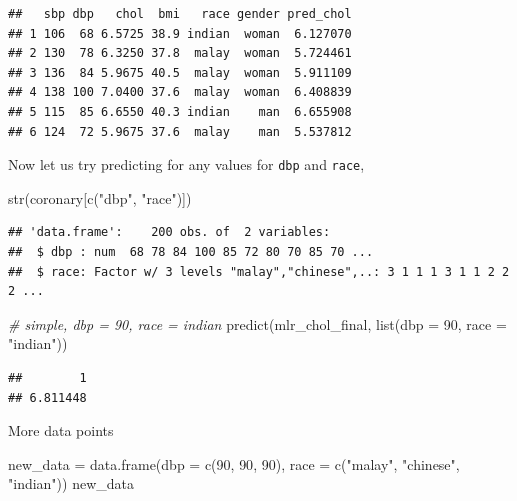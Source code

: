 \documentclass[
]{book}
\makeatletter
\newenvironment{Shaded}{\begin{snugshade}}{\end{snugshade}}
\newcommand{\AttributeTok}[1]{\textcolor[rgb]{0.61,0.61,0.61}{#1}}
\newcommand{\CommentTok}[1]{\textcolor[rgb]{0.37,0.37,0.37}{\textit{#1}}}
\newcommand{\DecValTok}[1]{\textcolor[rgb]{0.06,0.06,0.06}{#1}}
\newcommand{\FunctionTok}[1]{\textcolor[rgb]{0,0,0}{#1}}
\newcommand{\NormalTok}[1]{#1}
\newcommand{\OtherTok}[1]{\textcolor[rgb]{0.37,0.37,0.37}{#1}}
\newcommand{\SpecialCharTok}[1]{\textcolor[rgb]{0,0,0}{#1}}
\newcommand{\StringTok}[1]{\textcolor[rgb]{0.5,0.5,0.5}{#1}}
\newenvironment{kframe}{%
\medskip{}
\setlength{\fboxsep}{.8em}
 \def\at@end@of@kframe{}%
 \ifinner\ifhmode%
  \def\at@end@of@kframe{\end{minipage}}%
  \begin{minipage}{\columnwidth}%
 \fi\fi%
 \def\FrameCommand##1{\hskip\@totalleftmargin \hskip-\fboxsep
 \colorbox{shadecolor}{##1}\hskip-\fboxsep
     \hskip-\linewidth \hskip-\@totalleftmargin \hskip\columnwidth}%
 \MakeFramed {\advance\hsize-\width
   \@totalleftmargin\z@ \linewidth\hsize
   \@setminipage}}%
 {\par\unskip\endMakeFramed%
 \at@end@of@kframe}
\renewenvironment{Shaded}{\begin{kframe}}{\end{kframe}}
\makeatother
\begin{document}
\begin{Shaded}
\end{Shaded}

\begin{verbatim}
##   sbp dbp   chol  bmi   race gender pred_chol
## 1 106  68 6.5725 38.9 indian  woman  6.127070
## 2 130  78 6.3250 37.8  malay  woman  5.724461
## 3 136  84 5.9675 40.5  malay  woman  5.911109
## 4 138 100 7.0400 37.6  malay  woman  6.408839
## 5 115  85 6.6550 40.3 indian    man  6.655908
## 6 124  72 5.9675 37.6  malay    man  5.537812
\end{verbatim}

Now let us try predicting for any values for \texttt{dbp} and \texttt{race},

\begin{Shaded}
\begin{Highlighting}[]
\FunctionTok{str}\NormalTok{(coronary[}\FunctionTok{c}\NormalTok{(}\StringTok{"dbp"}\NormalTok{, }\StringTok{"race"}\NormalTok{)])}
\end{Highlighting}
\end{Shaded}

\begin{verbatim}
## 'data.frame':    200 obs. of  2 variables:
##  $ dbp : num  68 78 84 100 85 72 80 70 85 70 ...
##  $ race: Factor w/ 3 levels "malay","chinese",..: 3 1 1 1 3 1 1 2 2 2 ...
\end{verbatim}

\begin{Shaded}
\begin{Highlighting}[]
\CommentTok{\# simple, dbp = 90, race = indian}
\FunctionTok{predict}\NormalTok{(mlr\_chol\_final, }\FunctionTok{list}\NormalTok{(}\AttributeTok{dbp =} \DecValTok{90}\NormalTok{, }\AttributeTok{race =} \StringTok{"indian"}\NormalTok{))}
\end{Highlighting}
\end{Shaded}

\begin{verbatim}
##        1 
## 6.811448
\end{verbatim}

More data points

\begin{Shaded}
\begin{Highlighting}[]
\NormalTok{new\_data }\OtherTok{=} \FunctionTok{data.frame}\NormalTok{(}\AttributeTok{dbp =} \FunctionTok{c}\NormalTok{(}\DecValTok{90}\NormalTok{, }\DecValTok{90}\NormalTok{, }\DecValTok{90}\NormalTok{), }\AttributeTok{race =} \FunctionTok{c}\NormalTok{(}\StringTok{"malay"}\NormalTok{, }\StringTok{"chinese"}\NormalTok{, }\StringTok{"indian"}\NormalTok{))}
\NormalTok{new\_data}
\end{Highlighting}
\end{Shaded}
\end{document}
